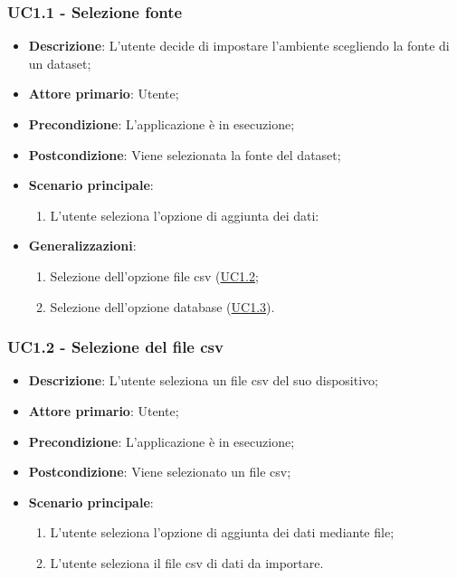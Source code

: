 \subsubsection{UC1.1 - Selezione fonte}
\label{ssub:uc1.1}
\begin{itemize}
    \item \textbf{Descrizione}: L'utente decide di impostare l'ambiente scegliendo la fonte di un dataset;

    \item \textbf{Attore primario}: Utente;
        
    \item \textbf{Precondizione}:   L'applicazione è in esecuzione;

    \item \textbf{Postcondizione}:  Viene selezionata la fonte del dataset;

	\item \textbf{Scenario principale}:
		\begin{enumerate}
			\item L'utente seleziona l'opzione di aggiunta dei dati:
        \end{enumerate}

        \item \textbf{Generalizzazioni}:
        \begin{enumerate}
            \item Selezione dell'opzione file csv (\hyperref[ssub:uc1.2]{UC1.2};
            \item Selezione dell'opzione database (\hyperref[ssub:uc1.3]{UC1.3}).
        \end{enumerate}
\end{itemize}


\subsubsection{UC1.2 - Selezione del file csv}
\label{ssub:uc1.2}
\begin{itemize}
    \item \textbf{Descrizione}: L'utente seleziona un file csv del suo dispositivo;

    \item \textbf{Attore primario}: Utente;
    
    \item \textbf{Precondizione}:   L'applicazione è in esecuzione;
    \item \textbf{Postcondizione}:  Viene selezionato un file csv;

	\item \textbf{Scenario principale}:
		\begin{enumerate}
			\item L'utente seleziona l'opzione di aggiunta dei dati mediante file;
			\item L'utente seleziona il file csv di dati da importare.
        \end{enumerate}
\end{itemize}

